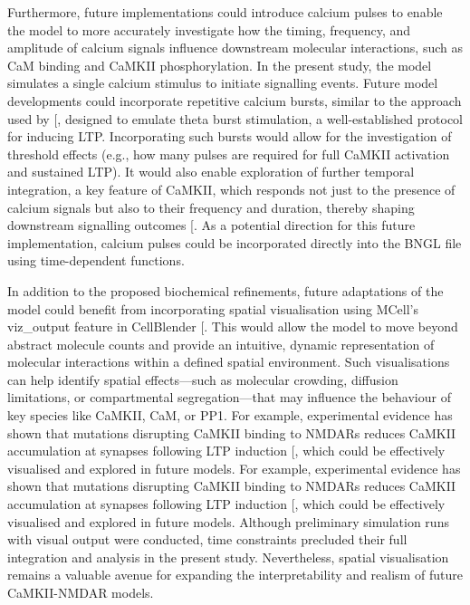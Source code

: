\documentclass[
  11pt,
  letterpaper,
]{scrreprt}
\begin{document}
Furthermore, future implementations could introduce calcium pulses to
enable the model to more accurately investigate how the timing,
frequency, and amplitude of calcium signals influence downstream
molecular interactions, such as CaM binding and CaMKII phosphorylation.
In the present study, the model simulates a single calcium stimulus to
initiate signalling events. Future model developments could incorporate
repetitive calcium bursts, similar to the approach used by
{[}\citeproc{ref-chang2019Mechanismsa}{477}{]}, designed to emulate
theta burst stimulation, a well-established protocol for inducing LTP.
Incorporating such bursts would allow for the investigation of threshold
effects (e.g., how many pulses are required for full CaMKII activation
and sustained LTP). It would also enable exploration of further temporal
integration, a key feature of CaMKII, which responds not just to the
presence of calcium signals but also to their frequency and duration,
thereby shaping downstream signalling outcomes
{[}\citeproc{ref-chang2017CaMKII}{153}{]}. As a potential direction for
this future implementation, calcium pulses could be incorporated
directly into the BNGL file using time-dependent functions.

In addition to the proposed biochemical refinements, future adaptations
of the model could benefit from incorporating spatial visualisation
using MCell's viz\_output feature in CellBlender
{[}\citeproc{ref-gupta2018Spatial}{298}{]}. This would allow the model
to move beyond abstract molecule counts and provide an intuitive,
dynamic representation of molecular interactions within a defined
spatial environment. Such visualisations can help identify spatial
effects---such as molecular crowding, diffusion limitations, or
compartmental segregation---that may influence the behaviour of key
species like CaMKII, CaM, or PP1. For example, experimental evidence has
shown that mutations disrupting CaMKII binding to NMDARs reduces CaMKII
accumulation at synapses following LTP induction
{[}\citeproc{ref-bayer2001Interactiona}{127}{]}, which could be
effectively visualised and explored in future models. For example,
experimental evidence has shown that mutations disrupting CaMKII binding
to NMDARs reduces CaMKII accumulation at synapses following LTP
induction {[}\citeproc{ref-bayer2001Interactiona}{127}{]}, which could
be effectively visualised and explored in future models. Although
preliminary simulation runs with visual output were conducted, time
constraints precluded their full integration and analysis in the present
study. Nevertheless, spatial visualisation remains a valuable avenue for
expanding the interpretability and realism of future CaMKII-NMDAR
models.
\end{document}
